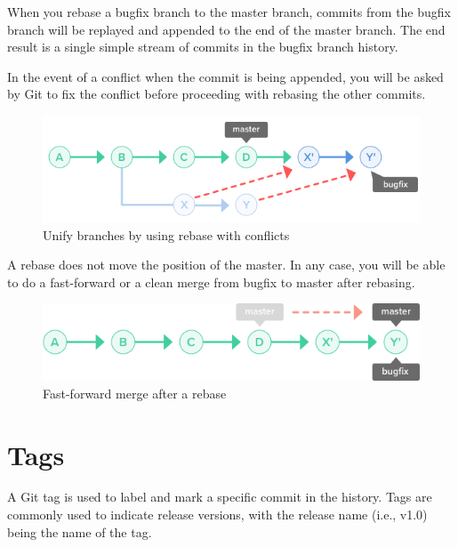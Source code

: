 \documentclass[10pt,a4paper,english]{report}
\begin{document}
    When you rebase a bugfix branch to the master branch, commits from the bugfix branch will be replayed and appended to the end of the master branch. The end result is a single simple stream of commits in the bugfix branch history.

    In the event of a conflict when the commit is being appended, you will be asked by Git to fix the conflict before proceeding with rebasing the other commits.

    \begin{figure}[ht]
    \begin{center}
    \includegraphics[scale=0.5]{images/rebase_branch_003.png}
    \end{center}
    \caption{Unify branches by using rebase with conflicts}
    \end{figure}

    A rebase does not move the position of the master. In any case, you will be able to do a fast-forward or a clean merge from bugfix to master after rebasing.

    \begin{figure}[ht]
    \begin{center}
    \includegraphics[scale=0.5]{images/rebase_branch_004.png}
    \end{center}
    \caption{Fast-forward merge after a rebase}
    \end{figure}

\chapter{Tags}

    A Git tag is used to label and mark a specific commit in the history. Tags are commonly used to indicate release versions, with the release name (i.e., v1.0) being the name of the tag.
\end{document}

